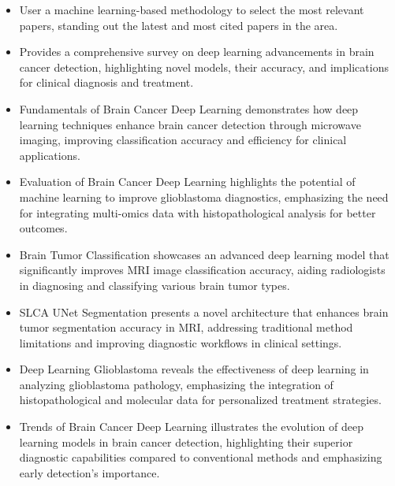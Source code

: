 \documentclass[runningheads]{llncs}
\begin{document}
\begin{itemize}[label=\textbullet]
    \item User a machine learning-based methodology to select the most relevant papers, standing out the latest and most cited papers in the area.
    \item Provides a comprehensive survey on deep learning advancements in brain cancer detection, highlighting novel models, their accuracy, and implications for clinical diagnosis and treatment.
    \item Fundamentals of Brain Cancer Deep Learning demonstrates how deep learning techniques enhance brain cancer detection through microwave imaging, improving classification accuracy and efficiency for clinical applications.
    \item Evaluation of Brain Cancer Deep Learning highlights the potential of machine learning to improve glioblastoma diagnostics, emphasizing the need for integrating multi-omics data with histopathological analysis for better outcomes.
    \item Brain Tumor Classification showcases an advanced deep learning model that significantly improves MRI image classification accuracy, aiding radiologists in diagnosing and classifying various brain tumor types.
    \item SLCA UNet Segmentation presents a novel architecture that enhances brain tumor segmentation accuracy in MRI, addressing traditional method limitations and improving diagnostic workflows in clinical settings.
    \item Deep Learning Glioblastoma reveals the effectiveness of deep learning in analyzing glioblastoma pathology, emphasizing the integration of histopathological and molecular data for personalized treatment strategies.
    \item Trends of Brain Cancer Deep Learning illustrates the evolution of deep learning models in brain cancer detection, highlighting their superior diagnostic capabilities compared to conventional methods and emphasizing early detection's importance.
\end{itemize}
\end{document}
